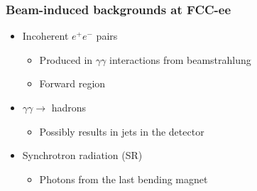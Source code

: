 \documentclass[hyperref={colorlinks=true,pdfpagelabels=false,linkcolor=black}, xcolor=dvipsnames,10pt]{beamer}
\begin{document}
\begin{frame}
\end{frame}

\begin{frame}
	\frametitle{Beam-induced backgrounds at FCC-ee}

  \begin{itemize}
    \item Incoherent $e^+e^-$ pairs
      \begin{itemize}
        \item Produced in $\gamma\gamma$ interactions from beamstrahlung
        \item Forward region \vspace{0.2cm}
      \end{itemize}
    \item $\gamma\gamma\rightarrow$ hadrons
      \begin{itemize}
        \item Possibly results in jets in the detector \vspace{0.2cm}
      \end{itemize}
    \item Synchrotron radiation (SR)
      \begin{itemize}
        \item Photons from the last bending magnet
      \end{itemize}
  \end{itemize}

\end{frame}
\end{document}
